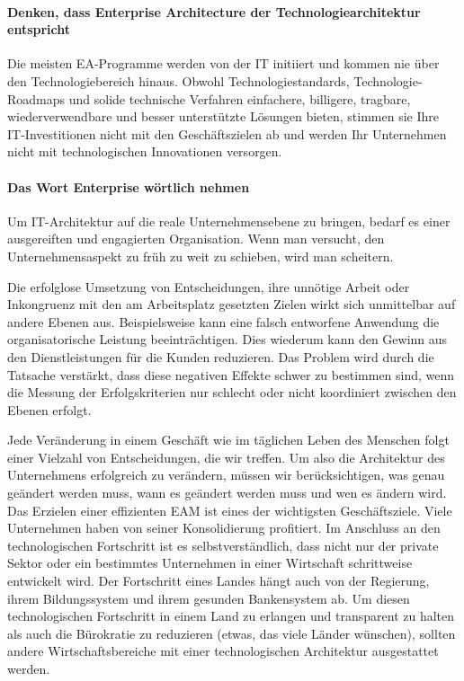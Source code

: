 \documentclass[
	doc,
	a4paper,
	helv
	]{apa6}
\begin{document}
\paragraph{Denken, dass Enterprise Architecture der Technologiearchitektur entspricht}
Die meisten EA-Programme werden von der IT initiiert und kommen nie über den Technologiebereich hinaus. Obwohl Technologiestandards, Technologie-Roadmaps und solide technische Verfahren einfachere, billigere, tragbare, wiederverwendbare und besser unterstützte Lösungen bieten, stimmen sie Ihre IT-Investitionen nicht mit den Geschäftszielen ab und werden Ihr Unternehmen nicht mit technologischen Innovationen versorgen.
\paragraph{Das Wort Enterprise wörtlich nehmen}
Um IT-Architektur auf die reale Unternehmensebene zu bringen, bedarf es einer ausgereiften und engagierten Organisation. Wenn man versucht, den Unternehmensaspekt zu früh zu weit zu schieben, wird man scheitern.

Die erfolglose Umsetzung von Entscheidungen, ihre unnötige Arbeit oder Inkongruenz mit den am Arbeitsplatz gesetzten Zielen wirkt sich unmittelbar auf andere Ebenen aus. Beispielsweise kann eine falsch entworfene Anwendung die organisatorische Leistung beeinträchtigen. Dies wiederum kann den Gewinn aus den Dienstleistungen für die Kunden reduzieren.
Das Problem wird durch die Tatsache verstärkt, dass diese negativen Effekte schwer zu bestimmen sind, wenn die Messung der Erfolgskriterien nur schlecht oder nicht koordiniert zwischen den Ebenen erfolgt.

Jede Veränderung in einem Geschäft wie im täglichen Leben des Menschen folgt einer Vielzahl von Entscheidungen, die wir treffen.
Um also die Architektur des Unternehmens erfolgreich zu verändern, müssen wir berücksichtigen, was genau geändert werden muss, wann es geändert werden muss und wen es ändern wird.
Das Erzielen einer effizienten EAM ist eines der wichtigsten Geschäftsziele. Viele Unternehmen haben von seiner Konsolidierung profitiert. %
Im Anschluss an den technologischen Fortschritt ist es selbstverständlich, dass nicht nur der private Sektor oder ein bestimmtes Unternehmen in einer Wirtschaft schrittweise entwickelt wird. Der Fortschritt eines Landes hängt auch von der Regierung, ihrem Bildungssystem und ihrem gesunden Bankensystem ab.
Um diesen technologischen Fortschritt in einem Land zu erlangen und transparent zu halten als auch die Bürokratie zu reduzieren (etwas, das viele Länder wünschen), sollten andere Wirtschaftsbereiche mit einer technologischen Architektur ausgestattet werden.
\end{document}
